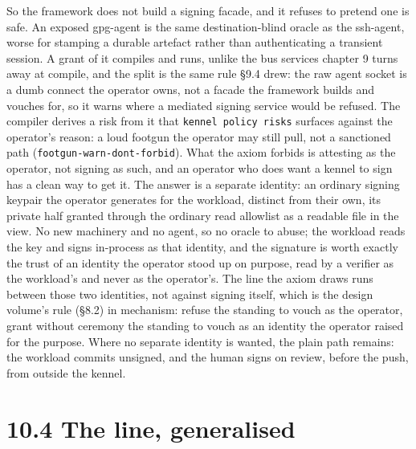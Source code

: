 So the framework does not build a signing facade, and it refuses to
pretend one is safe. An exposed gpg-agent is the same destination-blind
oracle as the ssh-agent, worse for stamping a durable artefact rather
than authenticating a transient session. A grant of it compiles and
runs, unlike the bus services chapter 9 turns away at compile, and the
split is the same rule §9.4 drew: the raw agent socket is a dumb connect
the operator owns, not a facade the framework builds and vouches for, so
it warns where a mediated signing service would be refused. The compiler
derives a risk from it that \texttt{kennel\ policy\ risks} surfaces
against the operator's reason: a loud footgun the operator may still
pull, not a sanctioned path (\texttt{footgun-warn-dont-forbid}). What
the axiom forbids is attesting as the operator, not signing as such, and
an operator who does want a kennel to sign has a clean way to get it.
The answer is a separate identity: an ordinary signing keypair the
operator generates for the workload, distinct from their own, its
private half granted through the ordinary read allowlist as a readable
file in the view. No new machinery and no agent, so no oracle to abuse;
the workload reads the key and signs in-process as that identity, and
the signature is worth exactly the trust of an identity the operator
stood up on purpose, read by a verifier as the workload's and never as
the operator's. The line the axiom draws runs between those two
identities, not against signing itself, which is the design volume's
rule (§8.2) in mechanism: refuse the standing to vouch as the operator,
grant without ceremony the standing to vouch as an identity the operator
raised for the purpose. Where no separate identity is wanted, the plain
path remains: the workload commits unsigned, and the human signs on
review, before the push, from outside the kennel.

\hypertarget{the-line-generalised}{%
\section{10.4 The line, generalised}\label{the-line-generalised}}

